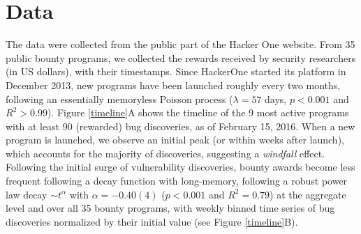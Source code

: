 \section{Data}
\label{sec:data}
The data were collected from the public part of the Hacker One website. From 35 public bounty programs, we collected the rewards received by security researchers (in US dollars), with their timestamps. Since HackerOne started its platform in December 2013, new programs have been launched roughly every two months, following an essentially memoryless Poisson process ($\lambda = 57$ days, $p < 0.001$ and $R^2 > 0.99$). Figure \ref{timeline}A shows the timeline of the 9 most active programs with at least 90 (rewarded) bug discoveries, as of February 15, 2016. When a new program is launched, we observe an initial peak (or within weeks after launch), which accounts for the majority of discoveries, suggesting a {\it windfall} effect. Following the initial surge of vulnerability discoveries, bounty awards become less frequent following a decay function with long-memory, following a robust power law decay $\sim t^{\alpha}$ with $\alpha = -0.40(4)$ ($p < 0.001$ and $R^2 = 0.79$) at the aggregate level and over all 35 bounty programs, with weekly binned time series of bug discoveries normalized by their initial value (see Figure \ref{timeline}B).\\


